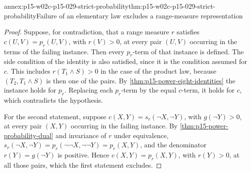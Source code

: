 \begin{annexitem}{annex:p15-w02c-p15-029-strict-probability}{thm:p15-w02c-p15-029-strict-probability}{Failure of an elementary law excludes a range-measure representation}
\begin{proof}
Suppose, for contradiction, that a range measure \(r\) satisfies
\(c(U,V)=p_r(U,V)\), with \(r(V)>0\), at every pair \((U,V)\) occurring
in the terms of the failing instance. Then every \(p_r\)-term of that
instance is defined. The side condition of the identity is also
satisfied, since it is the condition assumed for \(c\). This includes
\(r(T_1\land S)>0\) in the case of the product law, because
\((T_2,T_1\land S)\) is then one of the pairs. By
\cref{thm:p15-power-eight-identities} the instance holds for \(p_r\).
Replacing each \(p_r\)-term by the equal \(c\)-term, it holds for \(c\),
which contradicts the hypothesis.

For the second statement, suppose \(c(X,Y)=s_r(\neg X,\neg Y)\), with
\(g(\neg Y)>0\), at every pair \((X,Y)\) occurring in the failing
instance. By \cref{thm:p15-power-probability-dual} and invariance of
\(r\) under equivalence,
\(s_r(\neg X,\neg Y)=p_r(\neg\neg X,\neg\neg Y)=p_r(X,Y)\), and the
denominator \(r(Y)=g(\neg Y)\) is positive. Hence \(c(X,Y)=p_r(X,Y)\),
with \(r(Y)>0\), at all those pairs, which the first statement
excludes.
\end{proof}
\end{annexitem}

